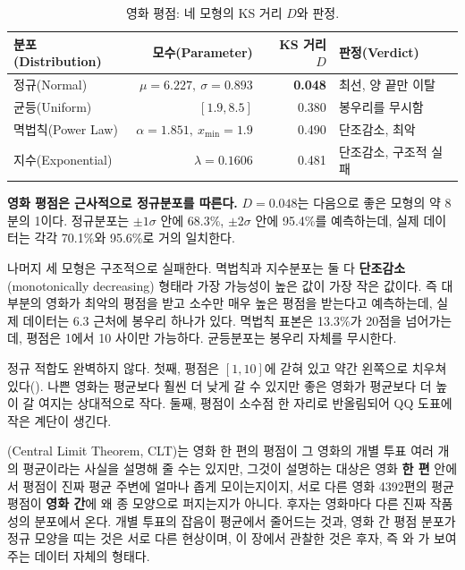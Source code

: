 \begin{table}[H]
\centering
\begin{tabular}{lrrl}
\toprule
분포(Distribution) & 모수(Parameter) & KS 거리 $D$ & 판정(Verdict) \\
\midrule
정규(Normal)           & $\mu=6.227,\ \sigma=0.893$   & \textbf{0.048} & 최선, 양 끝만 이탈 \\
\midrule
균등(Uniform)           & $[1.9, 8.5]$                  & 0.380          & 봉우리를 무시함 \\
\midrule
멱법칙(Power Law)      & $\alpha=1.851,\ x_{\min}=1.9$ & 0.490          & 단조감소, 최악 \\
\midrule
지수(Exponential)      & $\lambda=0.1606$              & 0.481          & 단조감소, 구조적 실패 \\
\bottomrule
\end{tabular}
\caption{영화 평점: 네 모형의 KS 거리 $D$와 판정.}
\label{tab:hw2-movie-verdict}
\end{table}

\textbf{영화 평점은 근사적으로 정규분포를 따른다.} $D=0.048$는 다음으로 좋은 모형의
약 8분의 1이다. 정규분포는 $\pm1\sigma$ 안에 68.3\%, $\pm2\sigma$ 안에 95.4\%를
예측하는데, 실제 데이터는 각각 70.1\%와 95.6\%로 거의 일치한다.

나머지 세 모형은 구조적으로 실패한다. 멱법칙과 지수분포는 둘 다
\textbf{단조감소}(monotonically decreasing) 형태라 가장 가능성이 높은 값이 가장
작은 값이다. 즉 대부분의 영화가 최악의 평점을 받고 소수만 매우 높은 평점을 받는다고
예측하는데, 실제 데이터는 6.3 근처에 봉우리 하나가 있다. 멱법칙 표본은 13.3\%가
20점을 넘어가는데, 평점은 1에서 10 사이만 가능하다. 균등분포는 봉우리 자체를
무시한다.

정규 적합도 완벽하지 않다. 첫째, 평점은 $[1, 10]$에 갇혀 있고 약간 왼쪽으로
치우쳐 있다(). 나쁜 영화는 평균보다 훨씬 더 낮게 갈 수 있지만
좋은 영화가 평균보다 더 높이 갈 여지는 상대적으로 작다. 둘째, 평점이 소수점
한 자리로 반올림되어 QQ 도표에 작은 계단이 생긴다.

(Central Limit Theorem, CLT)는 영화 한 편의 평점이 그 영화의
개별 투표 여러 개의 평균이라는 사실을 설명해 줄 수는 있지만, 그것이 설명하는 대상은
영화 \textbf{한 편} 안에서 평점이 진짜 평균 주변에 얼마나 좁게 모이는지이지, 서로
다른 영화 4392편의 평균 평점이 \textbf{영화 간}에 왜 종 모양으로 퍼지는지가 아니다.
후자는 영화마다 다른 진짜 작품성의 분포에서 온다. 개별 투표의 잡음이 평균에서
줄어드는 것과, 영화 간 평점 분포가 정규 모양을 띠는 것은 서로 다른 현상이며, 이
장에서 관찰한 것은 후자, 즉 와 가
보여주는 데이터 자체의 형태다.

